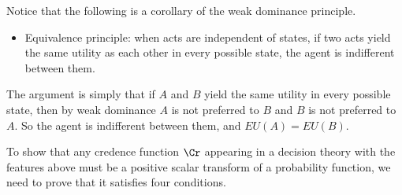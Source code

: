 Notice that the following is a corollary of the weak dominance principle.
\begin{itemize}
\item Equivalence principle: when acts are independent of states, if two acts yield the same utility as each other in every possible state, the agent is indifferent between them.
\end{itemize}
The argument is simply that if $A$ and $B$ yield the same utility in every possible state, then by weak dominance $A$ is not preferred to $B$ and $B$ is not preferred to $A$. So the agent is indifferent between them, and $EU(A)=EU(B)$.

To show that any credence function $\Cr$ appearing in a decision theory with the features above must be a positive scalar transform of a probability function, we need to prove that it satisfies four conditions.
